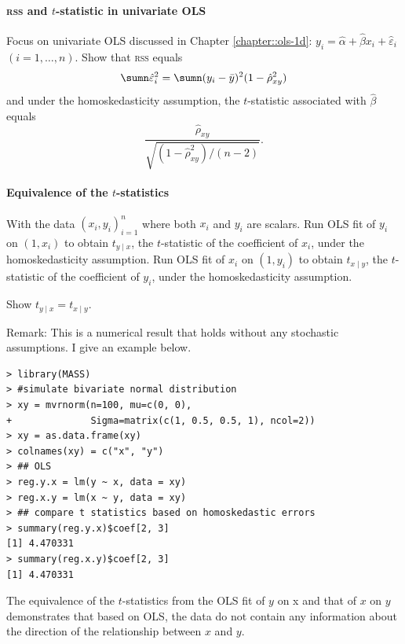  

 

\paragraph{\textsc{rss} and $t$-statistic in univariate OLS}\label{hw5::t-ratio-univariateOLS}


Focus on univariate OLS discussed in Chapter \ref{chapter::ols-1d}: $y_i = \hat{\alpha}  +  \hat{\beta} x_i + \hat{\varepsilon}_i$ $(i=1,\ldots, n)$. 
Show that \textsc{rss}  equals
$$
\sumn \hat{\varepsilon}_i^2 = \sumn (y_i -  \bar{y}  )^2 (1- \hat{\rho}_{xy} ^2)
$$ 
and under the homoskedasticity assumption, the $t$-statistic associated with $ \hat{\beta}$ equals
$$
\frac{  \hat{\rho}_{xy}   }{  \sqrt{    (1-\hat{\rho}_{xy} ^2) /(n-2)  }   }.
$$




\paragraph{Equivalence of the $t$-statistics}\label{hw5::t-stat-equivalent}



With the data $(x_i, y_i)_{i=1}^n$ where both $x_i$ and $y_i$ are scalars. Run OLS fit of $y_i$ on $(1,x_i)$ to obtain $t_{y\mid x}$, the $t$-statistic of the coefficient of $x_i$, under the homoskedasticity assumption. Run OLS fit of $x_i$ on $(1,y_i)$ to obtain $t_{x\mid y}$, the $t$-statistic of the coefficient of $y_i$, under the homoskedasticity assumption. 

Show $t_{y\mid x} = t_{x\mid y}$.

Remark: This is a numerical result that holds without any stochastic assumptions. I give an example below.

\begin{lstlisting}
> library(MASS)
> #simulate bivariate normal distribution
> xy = mvrnorm(n=100, mu=c(0, 0), 
+              Sigma=matrix(c(1, 0.5, 0.5, 1), ncol=2))
> xy = as.data.frame(xy)
> colnames(xy) = c("x", "y")
> ## OLS
> reg.y.x = lm(y ~ x, data = xy)
> reg.x.y = lm(x ~ y, data = xy)
> ## compare t statistics based on homoskedastic errors
> summary(reg.y.x)$coef[2, 3]
[1] 4.470331
> summary(reg.x.y)$coef[2, 3]
[1] 4.470331
\end{lstlisting}
The equivalence of the $t$-statistics from the OLS fit of $y$ on x and that of $x$ on $y$ demonstrates that based on OLS, the data do not contain any information about the direction of the relationship between $x$ and $y$. 

